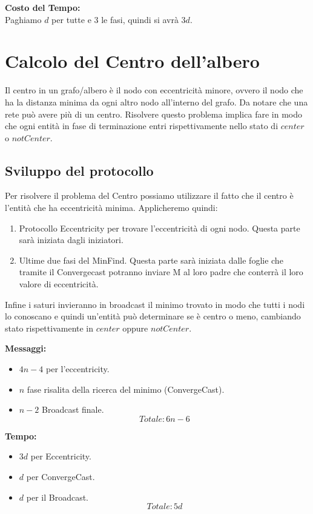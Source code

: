 \textbf{Costo del Tempo:}\\
Paghiamo $d$ per tutte e 3 le fasi, quindi si avrà $3d$.

\section{Calcolo del Centro dell'albero}
Il centro in un grafo/albero è il nodo con eccentricità minore, ovvero il nodo
che ha la distanza minima da ogni altro nodo all'interno del grafo. Da notare
che una rete può avere più di un centro. Risolvere questo problema implica fare
in modo che ogni entità in fase di terminazione entri rispettivamente nello
stato di $center$ o $notCenter$.\\
\subsection{Sviluppo del protocollo}
Per risolvere il problema del Centro possiamo utilizzare il fatto che il centro
è l'entità che ha eccentricità minima. Applicheremo quindi:
\begin{enumerate}
    \item Protocollo Eccentricity per trovare l'eccentricità di ogni nodo. Questa
          parte sarà iniziata dagli iniziatori.
    \item Ultime due fasi del MinFind. Questa parte sarà iniziata dalle foglie che
          tramite il Convergecast potranno inviare M al loro padre che conterrà il loro
          valore di eccentricità.
\end{enumerate}
Infine i saturi invieranno in broadcast il minimo trovato in modo che tutti i
nodi lo conoscano e quindi un'entità può determinare se è centro o meno,
cambiando stato rispettivamente in $center$ oppure $notCenter$.

\textbf{Messaggi:}
\begin{itemize}
    \item $4n - 4$ per l'eccentricity.
    \item $n$ fase risalita della ricerca del minimo (ConvergeCast).
    \item $n-2$ Broadcast finale.
          $$Totale: 6n -6$$
\end{itemize}
\textbf{Tempo:}
\begin{itemize}
    \item $3d$ per Eccentricity.
    \item $d$ per ConvergeCast.
    \item $d$ per il Broadcast.
          $$Totale: 5d$$
\end{itemize}


